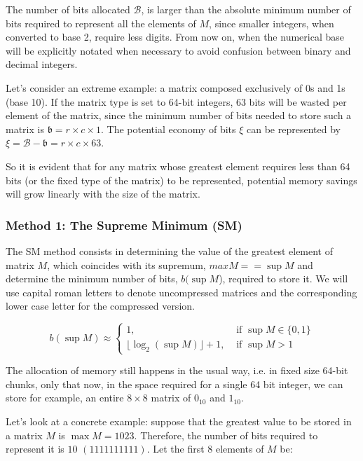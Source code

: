 \documentclass[10pt]{article}
\begin{document}
The number of bits allocated $\mathcal{B}$, is larger than the absolute minimum number of bits required to represent all the elements of $M$, since smaller integers, when converted to base 2, require less digits. From now on, when the numerical base will be explicitly notated when necessary to avoid confusion between binary and decimal integers.  

Let's consider an extreme example: a matrix composed exclusively of 0s and 1s (base 10). If the matrix type is set to 64-bit integers, 63 bits will be wasted per element of the matrix, since the minimum number of bits needed to store such a matrix is $\mathfrak{b} = r \times c \times 1$. The potential economy of bits $\xi$ can be represented by $\xi = \mathcal{B} - \mathfrak{b} =  r \times c \times 63$.


So it is evident that for any matrix whose greatest element requires less than 64 bits (or the fixed type of the matrix) to be represented, potential memory savings will grow linearly with the size of the matrix.

\subsubsection*{Method 1: The Supreme Minimum (SM)}

The SM method consists in determining the value of the greatest element of matrix $M$, which coincides with its supremum, $max M == \sup M$  and determine the minimum number of bits, $b(\sup M$), required to store it. We will use capital roman letters to denote uncompressed matrices and the corresponding lower case letter for the compressed version.

\begin{equation} \label{eq:07}
 b(\sup M) \approx \begin{cases}
	1, &  \text{ if } \sup M \in \{0,1\} \\ 
	\lfloor \log_2(\sup M)  \rfloor + 1,  & \text{ if } \sup M > 1  
	\end{cases}
\end{equation}

The allocation of memory still happens in the usual way, i.e. in fixed size 64-bit chunks, only that now, in the space required for a single 64 bit integer, we can store for example, an entire $8\times 8$ matrix of $0_{10}$ and $1_{10}$. 

Let's look at a concrete example: suppose that the greatest value to be stored in a matrix $M$ is $\max M=1023$. Therefore, the number of bits required to represent it is $10$ $(1111111111)$. Let the first 8 elements of $M$ be:
\end{document}

